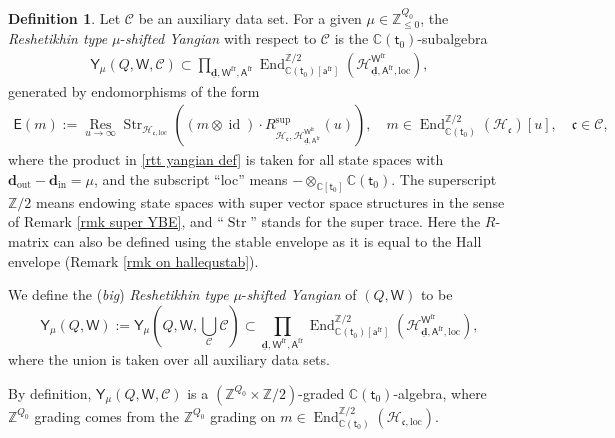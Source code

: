 \documentclass[10pt]{amsart}
\theoremstyle{definition}
\newtheorem{Definition}[Theorem]{Definition}
\numberwithin{equation}{section}
\newcommand{\bC}{\mathbb{C}}
\newcommand{\bZ}{\mathbb{Z}}
\newcommand{\bd}{\mathbf{d}}
\newcommand{\cH}{\mathcal{H}}
\newcommand{\loc}{\mathrm{loc}}
\newcommand{\sA}{\mathsf{A}}
\newcommand{\sW}{\mathsf{W}}
\newcommand{\End}{\operatorname{End}}
\newcommand{\Res}{\operatorname{Res}}
\newcommand{\str}{\operatorname{Str}}
\newcommand{\id}{\operatorname{id}}
\newcommand{\In}{\operatorname{in}}
\newcommand{\Out}{\operatorname{out}}
\begin{document}
\begin{Definition}\label{def of rtt yang}
Let $\mathcal C$ be an auxiliary data set. For a given $\mu\in \bZ_{\leqslant 0}^{Q_0}$, the \textit{Reshetikhin type} $\mu$-\textit{shifted Yangian} with respect to $\mathcal C$ is the $\bC(\mathsf t_0)$-subalgebra
\begin{align}\label{rtt yangian def}
    \mathsf Y_\mu(Q,\sW,\mathcal C)\subset \prod_{\underline{\bd},\sW^{\mathrm{fr}},\sA^{\mathrm{fr}}}\End^{\bZ/2}_{\bC(\mathsf t_0)[\mathsf a^{\mathrm{fr}}]}\left(\cH^{\sW^{\mathrm{fr}}}_{\underline{\bd},\mathsf A^{\mathrm{fr}},\mathrm{loc}}\right),
\end{align}
generated by endomorphisms of the form
\begin{align}\label{op E(m)}
    \mathsf E(m):=\underset{u\to \infty}{\Res}\str_{\cH_{\mathfrak{c},\loc}}\left((m\otimes \id)\cdot R^{\mathrm{sup}}_{\cH_{\mathfrak{c}},\cH^{\sW^{\mathrm{fr}}}_{\underline{\bd},\sA^{\mathrm{fr}}}}(u)\right),\quad m\in \End^{\bZ/2}_{\bC(\mathsf t_0)}(\cH_{\mathfrak{c}})[u],\quad \mathfrak{c}\in \mathcal C,
\end{align}
where the product in \eqref{rtt yangian def} is taken for all state spaces with $\bd_{\Out}-\bd_{\In}=\mu$, and the subscript ``loc'' means $-\otimes_{\bC[\mathsf t_0]}\bC(\mathsf t_0)$. The superscript $\bZ/2$ means endowing state spaces with super vector space structures in the sense of Remark \ref{rmk super YBE}, and ``$\str$'' stands for the super trace. 
Here the $R$-matrix can also be defined using the stable envelope as it is equal to the Hall envelope (Remark \ref{rmk on hallequstab}).

We define the (\textit{big}) \textit{Reshetikhin type} $\mu$-\textit{shifted Yangian} of $(Q,\sW)$ to be 
\begin{equation}\label{equ on rtt yangian}
    \mathsf Y_\mu(Q,\sW):=\mathsf Y_\mu(Q,\sW,\bigcup_{\mathcal C}\mathcal C)\subset \prod_{\underline{\bd},\sW^{\mathrm{fr}},\sA^{\mathrm{fr}}}\End^{\bZ/2}_{\bC(\mathsf t_0)[\mathsf a^{\mathrm{fr}}]}(\cH^{\sW^{\mathrm{fr}}}_{\underline{\bd},\sA^{\mathrm{fr}},\mathrm{loc}}),
\end{equation}
where the union is taken over all auxiliary data sets.
\end{Definition}

By definition, $\mathsf Y_\mu(Q,\sW,\mathcal C)$ is a $(\bZ^{Q_0}\times \bZ/2)$-graded $\bC(\mathsf t_0)$-algebra, where $\bZ^{Q_0}$ grading comes from the $\bZ^{Q_0}$ grading on $m\in \End^{\bZ/2}_{\bC(\mathsf t_0)}(\cH_{\mathfrak{c},\loc})$.
\end{document}
